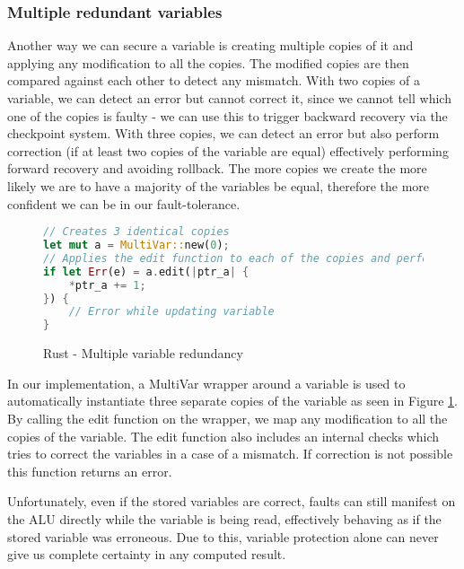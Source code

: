 \subsubsection{Multiple redundant variables}

Another way we can secure a variable is creating multiple copies of it and applying any modification to all the copies. The modified copies are then compared against each other to detect any mismatch. With two copies of a variable, we can detect an error but cannot correct it, since we cannot tell which one of the copies is faulty - we can use this to trigger backward recovery via the checkpoint system. With three copies, we can detect an error but also perform correction (if at least two copies of the variable are equal) effectively performing forward recovery and avoiding rollback. The more copies we create the more likely we are to have a majority of the variables be equal, therefore the more confident we can be in our fault-tolerance.

\begin{figure}[!h]
\begin{lstlisting}[language=Rust]
// Creates 3 identical copies
let mut a = MultiVar::new(0);
// Applies the edit function to each of the copies and performs equality check
if let Err(e) = a.edit(|ptr_a| {
    *ptr_a += 1;
}) {
    // Error while updating variable
}
\end{lstlisting}
\caption{Rust - Multiple variable redundancy}
\label{fig:multivar}
\end{figure}

In our implementation, a MultiVar wrapper around a variable is used to automatically instantiate three separate copies of the variable as seen in Figure \ref{fig:multivar}. By calling the edit function on the wrapper, we map any modification to all the copies of the variable. The edit function also includes an internal checks which tries to correct the variables in a case of a mismatch. If correction is not possible this function returns an error.

Unfortunately, even if the stored variables are correct, faults can still manifest on the ALU directly while the variable is being read, effectively behaving as if the stored variable was erroneous. Due to this, variable protection alone can never give us complete certainty in any computed result. 